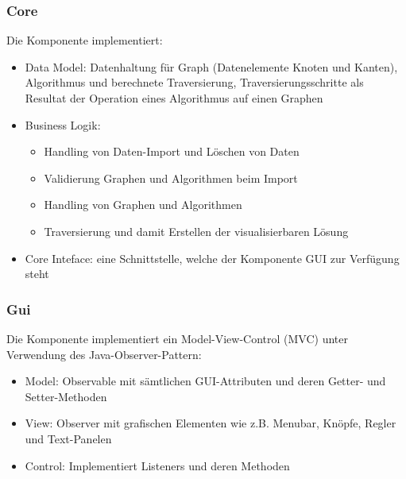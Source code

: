 \subsubsection{Core}
\label{subsubsec:Core}
Die Komponente implementiert:
\begin{itemize}
  \item Data Model: Datenhaltung f\"ur Graph (Datenelemente Knoten und Kanten), Algorithmus und berechnete Traversierung, Traversierungsschritte als Resultat der Operation eines Algorithmus auf einen Graphen
  \item Business Logik: 
  \begin{itemize}
      \item Handling von Daten-Import und L\"oschen von Daten
      \item Validierung Graphen und Algorithmen beim Import
      \item Handling von Graphen und Algorithmen
      \item Traversierung und damit Erstellen der visualisierbaren L\"osung
  \end{itemize}
  \item Core Inteface: eine Schnittstelle, welche der Komponente GUI zur Verf\"ugung steht
\end{itemize}
% 
\subsubsection{Gui}
\label{subsubsec:Gui}
Die Komponente implementiert ein Model-View-Control (MVC) unter Verwendung des Java-Observer-Pattern:
\begin{itemize}
  \item Model: Observable mit s\"amtlichen GUI-Attributen und deren Getter- und Setter-Methoden
  \item View: Observer mit grafischen Elementen wie z.B. Menubar, Kn\"opfe, Regler und Text-Panelen
  \item Control: Implementiert Listeners und deren Methoden
\end{itemize}
% 
